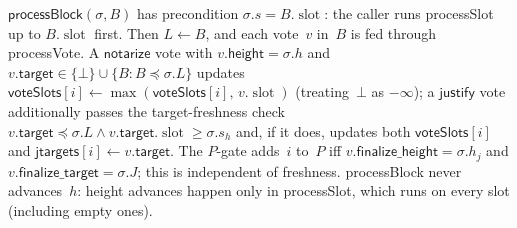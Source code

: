 \documentclass{article}
\newcommand{\slot}[0]{\ensuremath{\operatorname{\mathrm{slot}}}}
\newcommand{\target}{\mathsf{target}}
\newcommand{\height}{\mathsf{height}}
\newcommand{\just}{\ensuremath{\mathsf{justify}}\xspace}
\newcommand{\notar}{\ensuremath{\mathsf{notarize}}\xspace}
\newcommand{\finalizeHeight}{\mathsf{finalize\_height}}
\newcommand{\finalizeTarget}{\mathsf{finalize\_target}}
\newcommand{\jtargets}{\mathsf{jtargets}}
\newcommand{\voteSlots}{\mathsf{voteSlots}}
\newcommand{\processSlot}{\textsf{processSlot}\xspace}
\newcommand{\processBlock}{\textsf{processBlock}\xspace}
\newcommand{\processVote}{\textsf{processVote}\xspace}
\theoremstyle{plain}
\theoremstyle{definition}
\theoremstyle{remark}
\begin{document}
$\processBlock(\sigma, B)$ has precondition $\sigma.s = B.\slot$: the caller runs \processSlot up to $B.\slot$ first.
Then $L \gets B$, and each vote~$v$ in~$B$ is fed through \processVote.
A \notar vote with $v.\height = \sigma.h$ and $v.\target \in \{\bot\} \cup \{B : B \preceq \sigma.L\}$ updates $\voteSlots[i] \gets \max(\voteSlots[i],\, v.\slot)$ (treating~$\bot$ as $-\infty$); a \just vote additionally passes the target-freshness check $v.\target \preceq \sigma.L \wedge v.\target.\slot \geq \sigma.s_h$ and, if it does, updates both $\voteSlots[i]$ and $\jtargets[i] \gets v.\target$.
The $P$-gate adds~$i$ to~$P$ iff $v.\finalizeHeight = \sigma.h_j$ and $v.\finalizeTarget = \sigma.J$; this is independent of freshness.
\processBlock never advances~$h$: height advances happen only in \processSlot, which runs on every slot (including empty ones).
\end{document}
